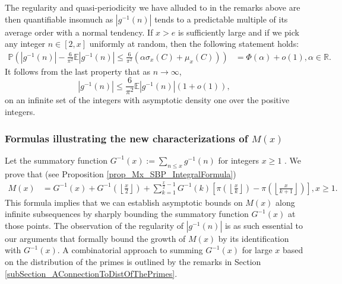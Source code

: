\documentclass[11pt,reqno,a4letter]{article}
\numberwithin{figure}{section}
\numberwithin{table}{section}
\newcommand{\seqnum}[1]{\href{http://oeis.org/#1}{\color{ProcessBlue}{\underline{#1}}}}
\newcommand{\Floor}[2]{\ensuremath{\left\lfloor \frac{#1}{#2} \right\rfloor}}
\theoremstyle{plain}
\numberwithin{theorem}{section}
\theoremstyle{definition}
\begin{document}
The regularity and quasi-periodicity we have alluded 
to in the remarks above are then 
quantifiable insomuch as $|g^{-1}(n)|$ 
tends to a predictable multiple of 
its average order with a normal tendency. 
If $x > e$ is sufficiently large and 
if we pick any integer $n \in [2, x]$ uniformly at random, then 
the following statement holds: 
\begin{align*} 
\tag{D} 
\mathbb{P}\left(|g^{-1}(n)| - \frac{6}{\pi^2} \mathbb{E}|g^{-1}(n)| \leq 
     \frac{6}{\pi^2}\left(\alpha \sigma_x(C) + \mu_x(C)\right)
     \right) & = 
     \Phi\left(\alpha\right) + o(1), \alpha \in \mathbb{R}. 
\end{align*} 
It follows from the last property that as $n \rightarrow \infty$, 
$$|g^{-1}(n)| \leq \frac{6}{\pi^2} \mathbb{E}|g^{-1}(n)|(1+o(1)),$$
on an infinite set of the integers with asymptotic density one over the 
positive integers. 

\subsubsection{Formulas illustrating the new characterizations of $M(x)$} 

Let the summatory function 
$G^{-1}(x) := \sum_{n \leq x} g^{-1}(n)$ for integers $x \geq 1$ 
\cite[\seqnum{A341472}]{OEIS}. 
We prove that (see Proposition \ref{prop_Mx_SBP_IntegralFormula}) 
\begin{align} 
\label{eqn_Mx_gInvnPixk_formula_v2} 
M(x) & = G^{-1}(x) + G^{-1}\left(\Floor{x}{2}\right) + 
     \sum_{k=1}^{\frac{x}{2}-1} G^{-1}(k) \left[ 
     \pi\left(\Floor{x}{k}\right) - \pi\left(\Floor{x}{k+1}\right) 
     \right], x \geq 1. 
\end{align} 
This formula 
implies that we can establish asymptotic bounds on 
$M(x)$ along infinite subsequences
by sharply bounding the summatory function $G^{-1}(x)$ at those points. 
The observation of the regularity of $|g^{-1}(n)|$ is as such essential to our arguments 
that formally bound the growth 
of $M(x)$ by its identification with $G^{-1}(x)$. 
A combinatorial approach to summing $G^{-1}(x)$ for large $x$ based on the distribution of the primes 
is outlined by the remarks in Section \ref{subSection_AConnectionToDistOfThePrimes}. 
\end{document}
